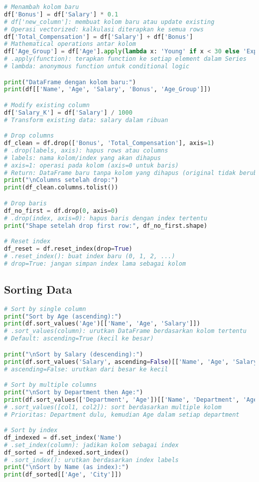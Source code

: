 \begin{lstlisting}[language=python, caption={Menambah, Mengubah, dan Menghapus Data}, style=python]
# Menambah kolom baru
df['Bonus'] = df['Salary'] * 0.1
# df['new_column']: membuat kolom baru atau update existing
# Operasi vectorized: kalkulasi diterapkan ke semua rows
df['Total_Compensation'] = df['Salary'] + df['Bonus']
# Mathematical operations antar kolom
df['Age_Group'] = df['Age'].apply(lambda x: 'Young' if x < 30 else 'Experienced')
# .apply(function): terapkan function ke setiap element dalam Series
# lambda: anonymous function untuk conditional logic

print("DataFrame dengan kolom baru:")
print(df[['Name', 'Age', 'Salary', 'Bonus', 'Age_Group']])

# Modify existing column
df['Salary_K'] = df['Salary'] / 1000
# Transform existing data: salary dalam ribuan

# Drop columns
df_clean = df.drop(['Bonus', 'Total_Compensation'], axis=1)
# .drop(labels, axis): hapus rows atau columns
# labels: nama kolom/index yang akan dihapus
# axis=1: operasi pada kolom (axis=0 untuk baris)
# Return: DataFrame baru tanpa kolom yang dihapus (original tidak berubah)
print("\nColumns setelah drop:")
print(df_clean.columns.tolist())

# Drop baris
df_no_first = df.drop(0, axis=0)
# .drop(index, axis=0): hapus baris dengan index tertentu
print("Shape setelah drop first row:", df_no_first.shape)

# Reset index
df_reset = df.reset_index(drop=True)
# .reset_index(): buat index baru (0, 1, 2, ...)
# drop=True: jangan simpan index lama sebagai kolom
\end{lstlisting}

\subsection*{Sorting Data}

\begin{lstlisting}[language=python, caption={Mengurutkan Data}, style=python]
# Sort by single column
print("Sort by Age (ascending):")
print(df.sort_values('Age')[['Name', 'Age', 'Salary']])
# .sort_values(column): urutkan DataFrame berdasarkan kolom tertentu
# Default: ascending=True (kecil ke besar)

print("\nSort by Salary (descending):")
print(df.sort_values('Salary', ascending=False)[['Name', 'Age', 'Salary']])
# ascending=False: urutkan dari besar ke kecil

# Sort by multiple columns
print("\nSort by Department then Age:")
print(df.sort_values(['Department', 'Age'])[['Name', 'Department', 'Age']])
# .sort_values([col1, col2]): sort berdasarkan multiple kolom
# Prioritas: Department dulu, kemudian Age dalam setiap department

# Sort by index
df_indexed = df.set_index('Name')
# .set_index(column): jadikan kolom sebagai index
df_sorted = df_indexed.sort_index()
# .sort_index(): urutkan berdasarkan index labels
print("\nSort by Name (as index):")
print(df_sorted[['Age', 'City']])
\end{lstlisting}

